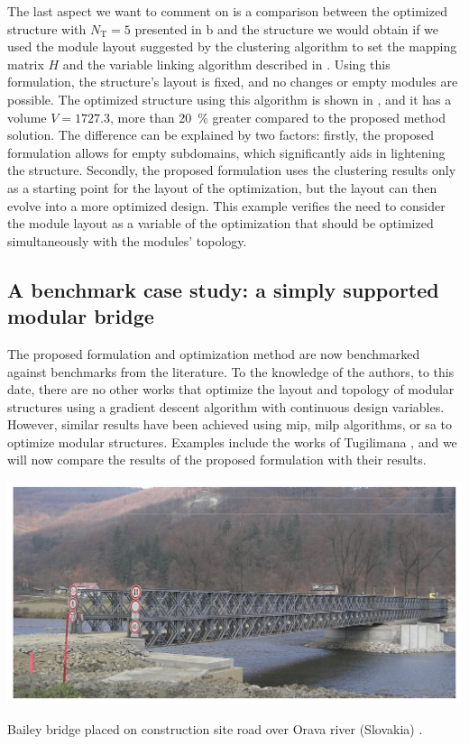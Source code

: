 The last aspect we want to comment on is a comparison between the optimized structure with $N_\text{T}=5$ presented in b and the structure we would obtain if we used the module layout suggested by the clustering algorithm to set the mapping matrix $H$ and the variable linking algorithm described in . Using this formulation, the structure's layout is fixed, and no changes or empty modules are possible. The optimized structure using this algorithm is shown in , and it has a volume $V = 1727.3$, more than \qty{20}{\percent} greater compared to the proposed method solution. The difference can be explained by two factors: firstly, the proposed formulation allows for empty subdomains, which significantly aids in lightening the structure. Secondly, the proposed formulation uses the clustering results only as a starting point for the layout of the optimization, but the layout can then evolve into a more optimized design. This example verifies the need to consider the module layout as a variable of the optimization that should be optimized simultaneously with the modules' topology.

\subsection{A benchmark case study: a simply supported modular bridge}
The proposed formulation and optimization method are now benchmarked against benchmarks from the literature. To the knowledge of the authors, to this date, there are no other works that optimize the layout and topology of modular structures using a gradient descent algorithm with continuous design variables. However, similar results have been achieved using \gls{mip}, \gls{milp} algorithms, or \gls{sa} to optimize modular structures. Examples include the works of Tugilimana \etal {}, and we will now compare the results of the proposed formulation with their results.

\begin{marginfigure}
    \centering
    \includegraphics[width=\linewidth]{figures/06_DMO/00_bailey_bridge/applsci-12-03788-g002.png}
    \caption{Bailey bridge placed on construction site road over Orava river (Slovakia) \cite{prokop_load-carrying_2022}. }
    \label{fig:06_bailey}
\end{marginfigure}

